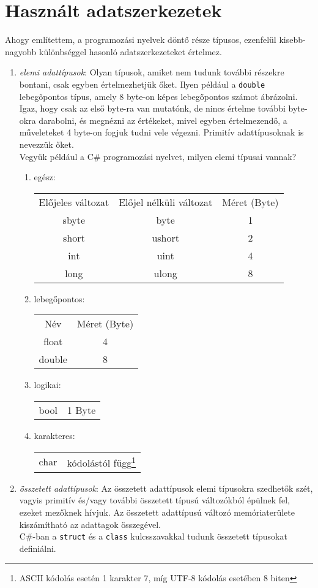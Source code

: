 \documentclass[tocnopagenum]{thesis-ekf}
\theoremstyle{definition}
\theoremstyle{remark}
\begin{document}
	\section{Használt adatszerkezetek}
	Ahogy említettem, a programozási nyelvek döntő része típusos, ezenfelül kisebb-nagyobb különbséggel hasonló adatszerkezeteket értelmez.
	\begin{enumerate}[label=\alph*)]
		\item \emph{elemi adattípusok}: Olyan típusok, amiket nem tudunk további részekre bontani, csak egyben értelmezhetjük őket. Ilyen például a \verb*|double| lebegőpontos típus, amely 8 byte-on képes lebegőpontos számot ábrázolni. Igaz, hogy csak az első byte-ra van mutatónk, de nincs értelme további byte-okra darabolni, és megnézni az értékeket, mivel egyben értelmezendő, a műveleteket 4 byte-on fogjuk tudni vele végezni. Primitív adattípusoknak is nevezzük őket.\\
		Vegyük például a C\# programozási nyelvet, milyen elemi típusai vannak?
			\begin{enumerate}
				\item egész:
				\begin{tabular}{ccc}
					Előjeles változat & Előjel nélküli változat & Méret (Byte) \\
					sbyte & byte & 1 \\
					short & ushort & 2 \\
					int & uint & 4 \\
					long & ulong & 8 \\
				\end{tabular}
				\item lebegőpontos:
				\begin{tabular}{cc}
					Név & Méret (Byte) \\
					float & 4 \\
					double & 8
				\end{tabular}
				\item logikai: 
				\begin{tabular}{cc}
					bool & 1 Byte
				\end{tabular}
				\item karakteres: 
				\begin{tabular}{cc}
					char & kódolástól függ\footnote{ASCII kódolás esetén 1 karakter 7, míg UTF-8 kódolás esetében 8 biten}
				\end{tabular}
			\end{enumerate}
	\item \emph{összetett adattípusok}: Az összetett adattípusok elemi típusokra szedhetők szét, vagyis primitív és/vagy további összetett típusú változókból épülnek fel, ezeket mezőknek hívjuk. Az összetett adattípusú változó memóriaterülete kiszámítható az adattagok összegével.\\
	C\#-ban a \verb*|struct| és a \verb*|class| kulcsszavakkal tudunk összetett típusokat definiálni.
	\end{enumerate}
\end{document}
